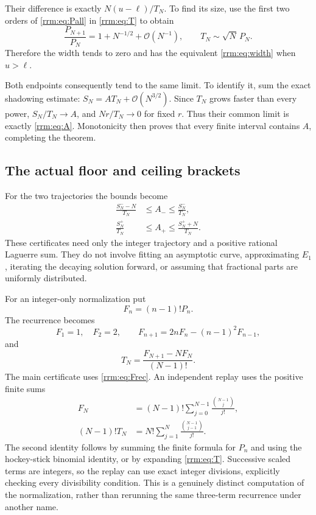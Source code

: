 \documentclass[11pt]{article}
\theoremstyle{remark}\newtheorem{remark}[theorem]{Remark}
\newcommand{\OO}{\mathcal O}
\begin{document}
Their difference is exactly $N(u-\ell)/T_N$. To find its size, use the first two orders of \eqref{rrm:eq:Pall} in \eqref{rrm:eq:T} to obtain
\begin{equation}\label{rrm:eq:Tasymp}
 \frac{P_{N+1}}{P_N}=1+N^{-1/2}+\OO(N^{-1}),
 \qquad T_N\sim\sqrt N\,P_N.
\end{equation}
Therefore the width tends to zero and has the equivalent \eqref{rrm:eq:width} when $u>\ell$.

Both endpoints consequently tend to the same limit. To identify it, sum the exact shadowing estimate: $S_N=AT_N+\OO(N^{3/2})$. Since $T_N$ grows faster than every power, $S_N/T_N\to A$, and $Nr/T_N\to0$ for fixed $r$. Thus their common limit is exactly \eqref{rrm:eq:A}. Monotonicity then proves that every finite interval contains $A$, completing the theorem.

\subsection{The actual floor and ceiling brackets}
For the two trajectories the bounds become
\begin{align}
 \frac{S_N^--N}{T_N}&\le A_-\le\frac{S_N^-}{T_N},\label{rrm:eq:floorcert}\\
 \frac{S_N^+}{T_N}&\le A_+\le\frac{S_N^++N}{T_N}.\label{rrm:eq:ceilcert}
\end{align}
These certificates need only the integer trajectory and a positive rational Laguerre sum. They do not involve fitting an asymptotic curve, approximating $E_1$, iterating the decaying solution forward, or assuming that fractional parts are uniformly distributed.

For an integer-only normalization put
\begin{equation}\label{rrm:eq:Fdef}
 F_n=(n-1)!P_n.
\end{equation}
The recurrence becomes
\begin{equation}\label{rrm:eq:Frec}
 F_1=1,\quad F_2=2,\qquad
 F_{n+1}=2nF_n-(n-1)^2F_{n-1},
\end{equation}
and
\begin{equation}\label{rrm:eq:Tinteger}
 T_N=\frac{F_{N+1}-NF_N}{(N-1)!}.
\end{equation}
The main certificate uses \eqref{rrm:eq:Frec}. An independent replay uses the positive finite sums
\begin{align}
 F_N&=(N-1)!\sum_{j=0}^{N-1}\frac{\binom{N-1}{j}}{j!},\label{rrm:eq:positiveP}\\
 (N-1)!T_N&=N!\sum_{j=1}^{N}\frac{\binom{N-1}{j-1}}{j!}.\label{rrm:eq:positiveT}
\end{align}
The second identity follows by summing the finite formula for $P_n$ and using the hockey-stick binomial identity, or by expanding \eqref{rrm:eq:T}. Successive scaled terms are integers, so the replay can use exact integer divisions, explicitly checking every divisibility condition. This is a genuinely distinct computation of the normalization, rather than rerunning the same three-term recurrence under another name.
\end{document}
